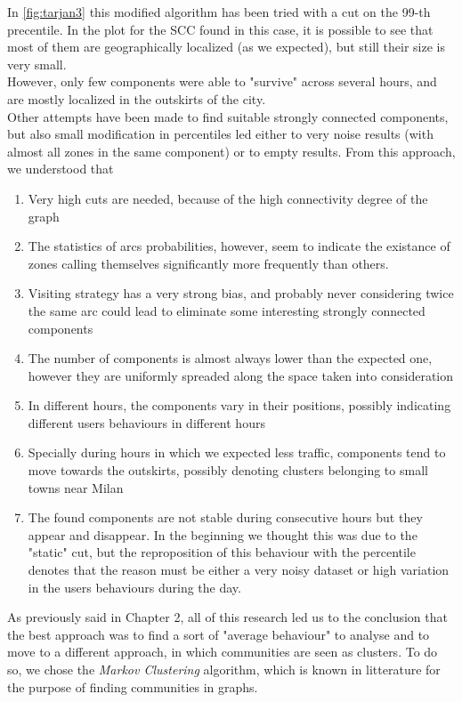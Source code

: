 \documentclass[12pt,a4paper]{article}
\begin{document}
In \ref{fig:tarjan3} this modified algorithm has been tried with a cut on the 99-th precentile. In the plot
for the SCC found in this case, it is possible to see that most of them are geographically localized (as we expected),
but still their size is very small. \\
However, only few components were able to "survive" across several hours, and are mostly localized in the outskirts 
of the city. \\
Other attempts have been made to find suitable strongly connected components, but also small modification in percentiles
led either to very noise results (with almost all zones in the same component) or to empty results. 
From this approach, we understood that
\begin{enumerate}
\item Very high cuts are needed, because of the high connectivity degree of the graph
\item The statistics of arcs probabilities, however, seem to indicate the existance of zones calling themselves significantly more frequently than others.
\item Visiting strategy has a very strong bias, and probably never considering twice the same arc could lead to eliminate some interesting strongly connected components
\item The number of components is almost always lower than the expected one, however they are uniformly spreaded along the space taken into consideration
\item In different hours, the components vary in their positions, possibly indicating different users behaviours in different hours
\item Specially during hours in which we expected less traffic, components tend to move towards the outskirts, possibly denoting clusters belonging to small towns near Milan
\item The found components are not stable during consecutive hours but they appear and disappear. In the beginning we thought this was due to the "static" cut, but the reproposition
of this behaviour with the percentile denotes that the reason must be either a very noisy dataset or high variation in the users behaviours during the day.
\end{enumerate}

As previously said in Chapter 2, all of this research led us to the conclusion that the best approach was to find a sort of "average behaviour" to analyse and
to move to a different approach, in which communities are seen as clusters. 
To do so, we chose the \emph{Markov Clustering} algorithm, which is known in litterature for the purpose of finding communities in graphs.
\end{document}
